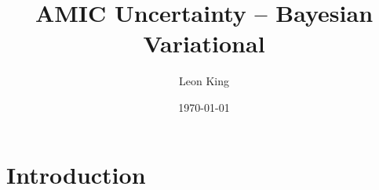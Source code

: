 \documentclass{article}
\title{AMIC Uncertainty – Bayesian Variational}
\author{Leon King}
\date{\today} %
\begin{document}
\maketitle

\section{Introduction}
\end{document}
